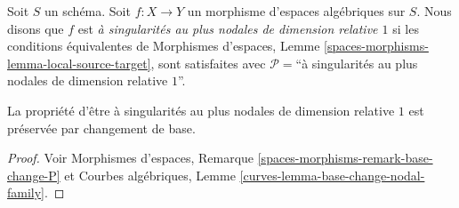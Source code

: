 \begin{definition}
\label{definition-nodal-family}
Soit $S$ un schéma.
Soit $f : X \to Y$ un morphisme d'espaces algébriques sur $S$.
Nous disons que $f$ est {\it à singularités au plus nodales de dimension relative $1$}
si les conditions équivalentes de
Morphismes d'espaces, Lemme \ref{spaces-morphisms-lemma-local-source-target},
sont satisfaites avec $\mathcal{P} =$``à singularités au plus nodales de dimension relative $1$''.
\end{definition}

\begin{lemma}
\label{lemma-base-change-nodal}
La propriété d'être à singularités au plus nodales de dimension relative $1$
est préservée par changement de base.
\end{lemma}

\begin{proof}
Voir
Morphismes d'espaces, Remarque \ref{spaces-morphisms-remark-base-change-P}
et
Courbes algébriques, Lemme \ref{curves-lemma-base-change-nodal-family}.
\end{proof}

